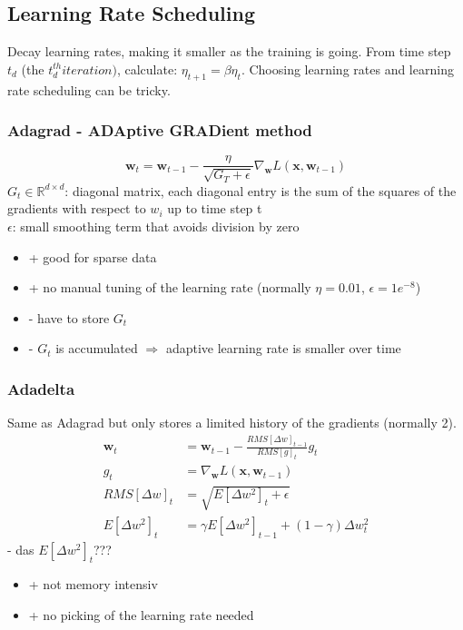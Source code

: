 \subsection{Learning Rate Scheduling}
\label{ssect:learning-rate-scheduling}
Decay learning rates, making it smaller as the training is going. From time step $t_d$ (the $t_d^{th} iteration)$, calculate: $\eta_{t+1} = \beta \eta_t$. Choosing learning rates and learning rate scheduling can be tricky.

\subsubsection{Adagrad - ADAptive GRADient method}
\label{sssect:adagrad-apaptive-gradient-method}
\[
\mathbf{w}_t = \mathbf{w}_{t - 1} - \frac{\eta}{\sqrt{G_T + \epsilon}} \nabla_{\mathbf{w}} L(\mathbf{x}, \mathbf{w}_{t-1})
\]
$G_t \in \mathbb{R}^{d \times d}$: diagonal matrix, each diagonal entry is the sum of the squares of the gradients with respect to $w_i$ up to time step t\\
$\epsilon$: small smoothing term that avoids division by zero
\begin{itemize}
	\item + good for sparse data
	\item + no manual tuning of the learning rate (normally $\eta = 0.01$, $\epsilon = 1e^{-8}$)
	\item - have to store $G_t$
	\item - $G_t$ is accumulated $\Rightarrow$ adaptive learning rate is smaller over time
\end{itemize}
\subsubsection{Adadelta}
\label{sssect:adadelta}
Same as Adagrad but only stores a limited history of the gradients (normally 2). 
\begin{align*}
\mathbf{w}_t &= \mathbf{w}_{t - 1} - \frac{RMS[\Delta w]_{t - 1}}{RMS[g]_t} g_t \\
g_t &= \nabla_{\mathbf{w}} L(\mathbf{x}, \mathbf{w}_{t-1}) \\
RMS[\Delta w]_t &= \sqrt{E[\Delta w^2]_t + \epsilon} \\
E[\Delta w^2]_t &= \gamma E[\Delta w^2]_{t-1} + (1 - \gamma) \Delta w_t^2
\end{align*}
- das $E[\Delta w^2]_t$???
\begin{itemize}
	\item + not memory intensiv
	\item + no picking of the learning rate needed
\end{itemize}

